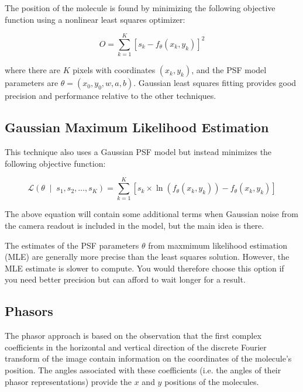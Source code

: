 \documentclass[10pt,a4paper]{book}
\newcommand{\given}{\;\middle|\;}
\begin{document}
The position of the molecule is found by minimizing the following objective function using a nonlinear least squares optimizer:

\begin{equation}
    O = \sum_{k=1}^K \left[ s_k - f_{\theta} \left(x_k, y_k\right)\right]^2
\end{equation}

\noindent where there are $K$ pixels with coordinates $\left( x_k, y_k\right)$, and the PSF model parameters are $\theta = \left( x_0, y_0, w, a, b \right)$. Gaussian least squares fitting provides good precision and performance relative to the other techniques.

\subsection{Gaussian Maximum Likelihood Estimation}

This technique also uses a Gaussian PSF model but instead minimizes the following objective function:

\begin{equation}
    \mathcal{L} \left(\theta \given s_1, s_2, \ldots, s_K \right) = \sum_{k=1}^K \left[ s_k \times \ln \left( f_{\theta} \left( x_k, y_k \right) \right) - f_{\theta} \left( x_k, y_k \right) \right]
\end{equation}

\noindent The above equation will contain some additional terms when Gaussian noise from the camera readout is included in the model, but the main idea is there.

The estimates of the PSF parameters $\theta$ from maxmimum likelihood estimation (MLE) are generally more precise than the least squares solution. However, the MLE estimate is slower to compute. You would therefore choose this option if you need better precision but can afford to wait longer for a result.

\subsection{Phasors}

The phasor approach is based on the observation that the first complex coefficients in the horizontal and vertical direction of the discrete Fourier transform of the image contain information on the coordinates of the molecule's position. The angles associated with these coefficients (i.e. the angles of their phasor representations) provide the $x$ and $y$ positions of the molecules.
\end{document}
